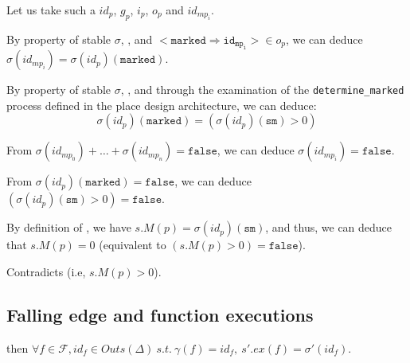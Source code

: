 \documentclass[dvipsnames,12pt]{article}
\begin{document}
\begin{niproof}
\begin{itemize}
\begin{itemize}
\begin{itemize}
        Let us take such a $id_{p}$, $g_{p}$, $i_{p}$, $o_{p}$
        and $id_{mp_i}$.

        By property of stable $\sigma$, \InCsCompP, and
        ${<}\mathtt{marked\Rightarrow{}id_{mp_i}}{>}\in{}o_{p}$, we
        can deduce $\sigma(id_{mp_i})=\sigma(id_{p})(\texttt{marked})$.

        By property of stable $\sigma$, \InCsCompP, and through the
        examination of the \texttt{determine_marked} process defined
        in the place design architecture, we can deduce:
        \begin{equation}
          \sigma(id_{p})(\texttt{marked})=(\sigma(id_{p})(\texttt{sm})>0)\label{eq:fe-eq-marked-gt-sm-zero}
        \end{equation}

        From
        $\sigma(id_{mp_0})+\dots+\sigma(id_{mp_n})=\mathtt{false}$, we
        can deduce $\sigma(id_{mp_i})=\mathtt{false}$.

        From $\sigma(id_{p})(\texttt{marked})=\mathtt{false}$, we can deduce
        $(\sigma(id_{p})(\texttt{sm})>0)=\mathtt{false}$.

        By definition of \upSim, we have $s.M(p)=\sigma(id_p)(\texttt{sm})$,
        and thus, we can deduce that $s.M(p)=0$ (equivalent to
        $(s.M(p)>0)=\mathtt{false}$).

        \noindent{}Contradicts  (i.e,
        $s.M(p)>0$).
      \end{itemize}
    \end{itemize}
  \end{itemize}
\end{niproof}

\subsection{Falling edge and function executions}
\label{sec:fe-fun-exec}

\begin{lemma}
  \label{lem:fe-equal-fun-exec}
  \fehyps{} then
  $\forall{}f\in\mathcal{F},id_f\in{}Outs(\Delta)~s.t.~\gamma(f)=id_f,~s'.ex(f)=\sigma'(id_f)$.
\end{lemma}
\end{document}
